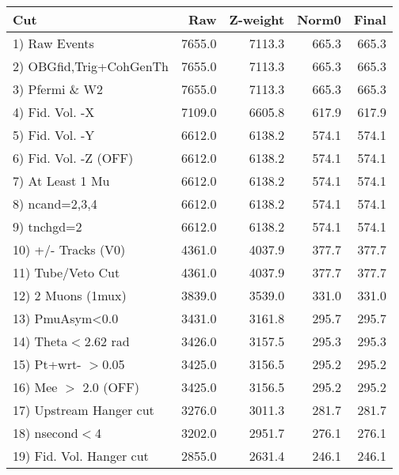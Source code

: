  \begin{table}[h!]\centering
 \begin{tabular}{||l||r|r|r|r||}
 \hline
 \hline
 Cut & Raw & Z-weight & Norm0 & Final \\
 \hline
  1) Raw Events           &      7655.0 &      7113.3 &       665.3 &       665.3 \\
  2) OBGfid,Trig+CohGenTh &      7655.0 &      7113.3 &       665.3 &       665.3 \\
  3) Pfermi \& W2         &      7655.0 &      7113.3 &       665.3 &       665.3 \\
  4) Fid. Vol. -X         &      7109.0 &      6605.8 &       617.9 &       617.9 \\
  5) Fid. Vol. -Y         &      6612.0 &      6138.2 &       574.1 &       574.1 \\
  6) Fid. Vol. -Z (OFF)   &      6612.0 &      6138.2 &       574.1 &       574.1 \\
  7) At Least 1 Mu        &      6612.0 &      6138.2 &       574.1 &       574.1 \\
  8) ncand=2,3,4          &      6612.0 &      6138.2 &       574.1 &       574.1 \\
  9) tnchgd=2             &      6612.0 &      6138.2 &       574.1 &       574.1 \\
 10) +/- Tracks (V0)      &      4361.0 &      4037.9 &       377.7 &       377.7 \\
 11) Tube/Veto Cut        &      4361.0 &      4037.9 &       377.7 &       377.7 \\
 12) 2 Muons (1mux)       &      3839.0 &      3539.0 &       331.0 &       331.0 \\
 13) PmuAsym<0.0          &      3431.0 &      3161.8 &       295.7 &       295.7 \\
 14) Theta$<$2.62 rad     &      3426.0 &      3157.5 &       295.3 &       295.3 \\
 15) Pt+wrt- $>$0.05      &      3425.0 &      3156.5 &       295.2 &       295.2 \\
 16) Mee $>$ 2.0  (OFF)   &      3425.0 &      3156.5 &       295.2 &       295.2 \\
 17) Upstream Hanger cut  &      3276.0 &      3011.3 &       281.7 &       281.7 \\
 18) nsecond$<$4          &      3202.0 &      2951.7 &       276.1 &       276.1 \\
 19) Fid. Vol. Hanger cut &      2855.0 &      2631.4 &       246.1 &       246.1 \\

\end{tabular}
\end{table}
